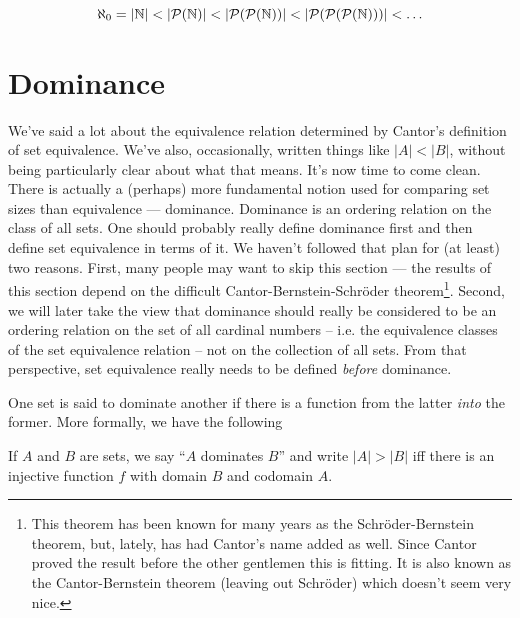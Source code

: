 \[ \aleph_0  = |{\mathbb N}| < |{\mathcal P}({\mathbb N})| < |{\mathcal P}({\mathcal P}({\mathbb N}))| < |{\mathcal P}({\mathcal P}({\mathcal P}({\mathbb N})))| < \ldots \]

\clearpage




\newpage

\section{Dominance}

We've said a lot about the equivalence relation 
determined by Cantor's definition
of set equivalence.  We've also, occasionally, written things like 
$|A| < |B|$, without being particularly clear about what that means.  
It's now time to come clean.  There is actually a (perhaps) more fundamental 
notion used for comparing set sizes than equivalence --- dominance. 
Dominance is an ordering relation on the class of all sets.  
One should probably really define dominance first and then
define set equivalence in terms of it.  We haven't followed that plan
for (at least) two reasons.   First, many people may want to skip this 
section --- the results of this section depend on the difficult 
Cantor-Bernstein-Schr\"{o}der theorem\footnote{This theorem has been %
known for many years as the Schr\"{o}der-Bernstein theorem, but, %
lately, has had Cantor's name added as well. Since Cantor proved %
the result before the other gentlemen this is fitting. It is also %
known as the Cantor-Bernstein theorem (leaving out Schr\"{o}der) %
which doesn't seem very nice.}.  Second, we will later take the view that dominance
should really be considered to be an ordering relation on the set of
all cardinal numbers -- i.e. the equivalence classes of the set equivalence
relation -- not on the collection of all sets.  From that perspective,
set equivalence really needs to be defined \emph{before} dominance.

One set is said to dominate another if there is a function from the latter
\emph{into} the former.
More formally, we have the following

\begin{defi}  If $A$ and $B$ are sets, we say ``$A$ dominates $B$'' 
and write $|A| > |B|$ iff there is an injective function $f$ with 
domain $B$ and codomain $A$.
\end{defi}

